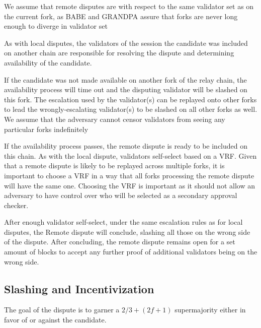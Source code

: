 We assume that remote disputes are with respect to the same validator set as on
the current fork, as BABE and GRANDPA assure that forks are never long enough to
diverge in validator set 
\newline

As with local disputes, the validators of the session the candidate was included
on another chain are responsible for resolving the dispute and determining
availability of the candidate.
\newline

If the candidate was not made available on another fork of the relay chain, the
availability process will time out and the disputing validator will be slashed
on this fork. The escalation used by the validator(s) can be replayed onto other
forks to lead the wrongly-escalating validator(s) to be slashed on all other
forks as well. We assume that the adversary cannot censor validators from seeing
any particular forks indefinitely 
\newline

If the availability process passes, the remote dispute is ready to be included
on this chain. As with the local dispute, validators self-select based on a VRF.
Given that a remote dispute is likely to be replayed across multiple forks, it
is important to choose a VRF in a way that all forks processing the remote
dispute will have the same one. Choosing the VRF is important as it should not
allow an adversary to have control over who will be selected as a secondary
approval checker.
\newline

After enough validator self-select, under the same escalation rules as for local
disputes, the Remote dispute will conclude, slashing all those on the wrong side
of the dispute. After concluding, the remote dispute remains open for a set
amount of blocks to accept any further proof of additional validators being on
the wrong side.

\subsection{Slashing and Incentivization}

The goal of the dispute is to garner a $2/3 + (2f + 1)$ supermajority either in
favor of or against the candidate.
\newline

